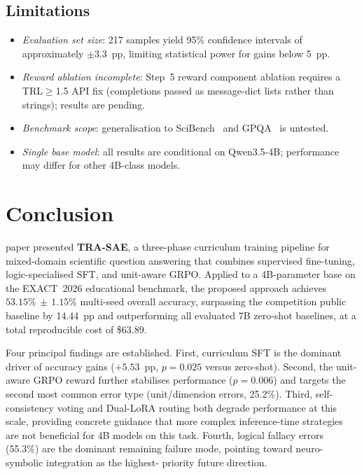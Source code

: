 \documentclass{ieeeaccess}
\newcommand{\modelname}{\textsc{TRA-SAE}}
\newcommand{\basemodelname}{Qwen3.5-4B}
\newcommand{\dataset}{EXACT~2026}
\begin{document}
\subsection{Limitations}

\begin{itemize}
  \item \emph{Evaluation set size}: 217 samples yield 95\% confidence
        intervals of approximately $\pm3.3$~pp, limiting statistical
        power for gains below 5~pp.

  \item \emph{Reward ablation incomplete}: Step~5 reward component
        ablation requires a TRL$\geq$1.5 API fix (completions passed as
        message-dict lists rather than strings); results are pending.

  \item \emph{Benchmark scope}: generalisation to SciBench~\cite{b15}
        and GPQA~\cite{b17} is untested.

  \item \emph{Single base model}: all results are conditional on
        \basemodelname{}; performance may differ for other 4B-class models.
\end{itemize}

\section{Conclusion}
\label{sec:conclusion}

 paper presented \textbf{\modelname{}}, a three-phase
curriculum training pipeline for mixed-domain scientific question answering
that combines supervised fine-tuning, logic-specialised SFT, and
unit-aware GRPO.
Applied to a 4B-parameter base on the \dataset{} educational benchmark,
the proposed approach achieves $53.15\%\,\pm\,1.15\%$ multi-seed overall
accuracy, surpassing the competition public baseline by 14.44~pp and
outperforming all evaluated 7B zero-shot baselines, at a total reproducible
cost of \$63.89.

Four principal findings are established.
First, curriculum SFT is the dominant driver of accuracy gains
($+5.53$~pp, $p=0.025$ versus zero-shot).
Second, the unit-aware GRPO reward further stabilises performance
($p=0.006$) and targets the second most common error type (unit/dimension
errors, 25.2\%).
Third, self-consistency voting and Dual-LoRA routing both degrade
performance at this scale, providing concrete guidance that more complex
inference-time strategies are not beneficial for 4B models on this task.
Fourth, logical fallacy errors (55.3\%) are the dominant remaining
failure mode, pointing toward neuro-symbolic integration as the highest-
priority future direction.
\end{document}
